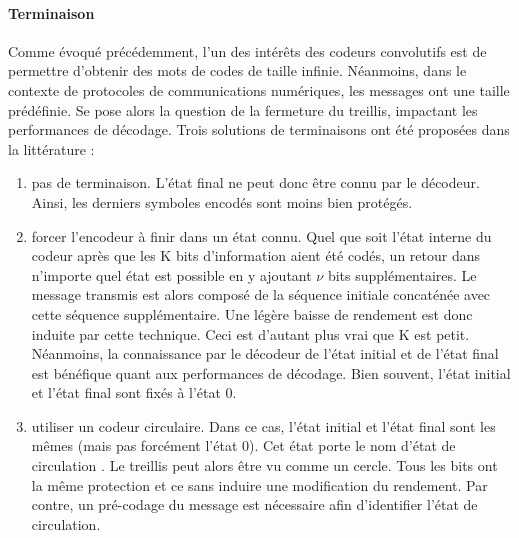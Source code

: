 \paragraph*{Terminaison}\label{par:term}
Comme évoqué précédemment, l'un des intérêts des codeurs convolutifs est de permettre d'obtenir des mots de codes de 
taille infinie. Néanmoins, dans le contexte de protocoles de communications numériques, les messages ont une taille 
prédéfinie. 
Se pose alors la question de la fermeture du treillis, impactant les performances de décodage.
Trois solutions de terminaisons ont été proposées dans la littérature :
\begin{enumerate}
	\item pas de terminaison. L'état final ne peut donc être connu par le décodeur. Ainsi, les derniers symboles encodés
	      sont moins bien protégés. 
	\item forcer l'encodeur à finir dans un état connu. 
	      Quel que soit l'état interne du codeur après que les K bits d'information aient été codés, un retour dans n'importe 
	      quel état est possible en y ajoutant $\nu$ bits supplémentaires. Le message transmis est alors composé de la 
	      séquence initiale concaténée avec cette séquence supplémentaire. Une légère baisse de rendement est donc induite par cette technique. 
	      Ceci est d'autant plus vrai que K est petit. 
	      Néanmoins, la connaissance par le décodeur de l'état initial et de l'état final est bénéfique quant aux performances de décodage. Bien souvent, l'état initial et l'état final sont fixés à l'état 0.
	\item utiliser un codeur circulaire. Dans ce cas, l'état initial et l'état final sont les mêmes (mais pas forcément 
	      l'état 0). Cet état porte le nom d'état de circulation \cite{circular}. Le treillis peut alors être vu comme un 
	      cercle. Tous les bits ont la même protection et ce sans induire une modification du rendement. Par contre, 
	      un pré-codage du message est nécessaire afin d'identifier l'état de circulation.
\end{enumerate}

